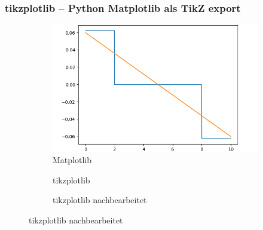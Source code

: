 \documentclass[handout]{beamer}
\begin{document}
\begin{frame}[fragile]
    \frametitle{tikzplotlib -- Python Matplotlib als TikZ export}%
    \vspace*{-1ex}
    \begin{figure}
        \begin{subfigure}{0.5\textwidth}
            \centering
        \end{subfigure}%
        \begin{subfigure}{0.5\textwidth}
            \centering
            \includegraphics[width=.8\linewidth]{images/tikzplotlib/tpl-example-crop}
            \caption{Matplotlib}
        \end{subfigure}%

        \begin{subfigure}{0.5\textwidth}
            
            \caption{tikzplotlib}
        \end{subfigure}%
        \begin{subfigure}{0.5\textwidth}
            \raisebox{0.65ex}{}
            \caption{tikzplotlib nachbearbeitet}
        \end{subfigure}%
    \end{figure}
\end{frame}
\end{document}
